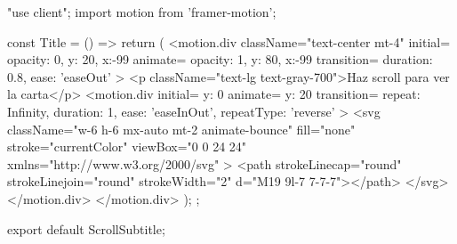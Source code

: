 "use client";
import { motion } from 'framer-motion';

const Title = () => {
  return (
    <motion.div
      className="text-center mt-4"
      initial={{ opacity: 0, y: 20, x:-99 }}
      animate={{ opacity: 1, y: 80, x:-99 }}
      transition={{ duration: 0.8, ease: 'easeOut' }}
    >
      <p className="text-lg text-gray-700">Haz scroll para ver la carta</p>
      <motion.div
        initial={{ y: 0 }}
        animate={{ y: 20 }}
        transition={{ repeat: Infinity, duration: 1, ease: 'easeInOut', repeatType: 'reverse' }}
      >
        <svg
          className="w-6 h-6 mx-auto mt-2 animate-bounce"
          fill="none"
          stroke="currentColor"
          viewBox="0 0 24 24"
          xmlns="http://www.w3.org/2000/svg"
        >
          <path strokeLinecap="round" strokeLinejoin="round" strokeWidth="2" d="M19 9l-7 7-7-7"></path>
        </svg>
      </motion.div>
    </motion.div>
  );
};

export default ScrollSubtitle;
